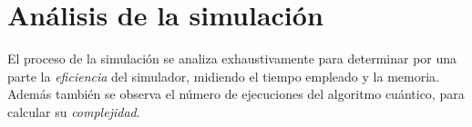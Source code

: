 

\setcounter{part}{4}
\usetikzlibrary{shapes,arrows,chains}
\usetikzlibrary{decorations.markings}



%
%
%


\part{Análisis de la simulación}

El proceso de la simulación se analiza exhaustivamente para determinar por una 
parte la \textit{eficiencia} del simulador, midiendo el tiempo empleado y la 
memoria. Además también se observa el número de ejecuciones del algoritmo 
cuántico, para calcular su \textit{complejidad}.

